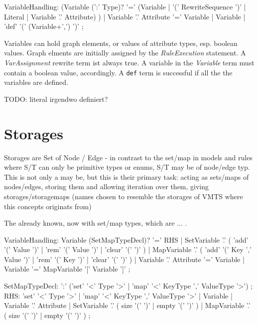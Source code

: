 \begin{rail}
  VariableHandling: 
    (Variable (':' Type)? '=' 
	  (Variable | 
      '(' RewriteSequence ')' | 
      Literal | 
	  Variable '.' Attribute)
    ) |
	Variable '.' Attribute '=' Variable |
    Variable |
    'def' '(' (Variable+',') ')'
;
\end{rail}\makeatother
Variables can hold graph elements, or values of attribute types, esp. boolean values.
Graph elments are initially assigned by the \emph{RuleExecution} statement.
A \emph{VarAssignment} rewrite term ist always true.
A variable in the \emph{Variable} term must contain a boolean value, accordingly.
A \texttt{def} term is successful if all the the variables are defined.

TODO: literal irgendwo definiert?

 
\section{Storages}

Storages are Set of Node / Edge 
- in contrast to the set/map in models and rules where S/T can only be primitive types or enums,
 S/T may be of node/edge typ. This is not only a may be, but this is their primary task:
 acting as sets/maps of nodes/edges, storing them and allowing iteration over them,
 giving storages/storagemaps (names chosen to resemble the storages of VMTS where this concepts originats from)

 The already known, now with set/map types, which are ... .
 
\begin{rail}
  VariableHandling: 
    Variable (SetMapTypeDecl)? '=' RHS |
    SetVariable '.' ( 'add' '(' Value ')' | 'rem' '(' Value ')' | 'clear' '(' ')' ) |
    MapVariable '.' ( 'add' '(' Key ',' Value ')' | 'rem' '(' Key ')' | 'clear' '(' ')' ) |
	Variable '.' Attribute '=' Variable |
	Variable '=' MapVariable '[' Variable ']'
    ;
\end{rail}\makeatother

\begin{rail}
  SetMapTypeDecl: 
    ':' ('set' '<' Type '>' | 'map' '<' KeyType ',' ValueType '>')
    ;
  RHS:
    'set' '<' Type '>' |
    'map' '<' KeyType ',' ValueType '>' |
	Variable |
	Variable '.' Attribute |
    SetVariable '.' ( size '(' ')' | empty '(' ')' ) |
    MapVariable '.' ( size '(' ')' | empty '(' ')' )
    ;
\end{rail}\makeatother

